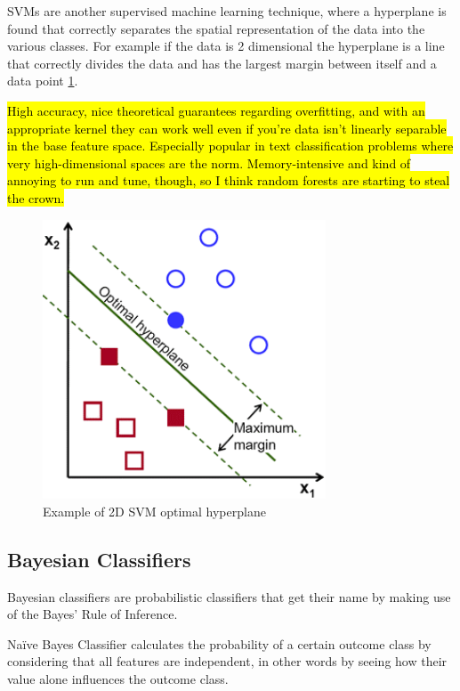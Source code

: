 SVMs are another supervised machine learning technique, where a hyperplane is found that correctly separates the spatial representation of the data into 
the various classes.  For example if the data is 2 dimensional the hyperplane is a line that correctly divides the data and has the largest margin
 between itself and a data point \ref{fig:svm}. 
 
 \hl{High accuracy, nice theoretical guarantees regarding overfitting, and with an appropriate kernel they can work well even if you're data isn't linearly 
separable in the base feature space. Especially popular in text classification problems where very high-dimensional spaces are the norm. Memory-intensive
 and kind of annoying to run and tune, though, so I think random forests are starting to steal the crown.}

\begin{figure}[!htb]
  \centering
  \includegraphics[width=0.75\textwidth]{Figures/svm.png}
  \caption{Example of 2D SVM optimal hyperplane}
  \label{fig:svm}
\end{figure}

\subsection{Bayesian Classifiers}
\label{subsection:bc}

Bayesian classifiers are probabilistic classifiers that get their name by making use of the Bayes’ Rule of Inference. 

Naïve Bayes Classifier calculates the probability of a certain outcome class by considering that all features are independent,
 in other words by seeing how their value alone influences the outcome class. 

